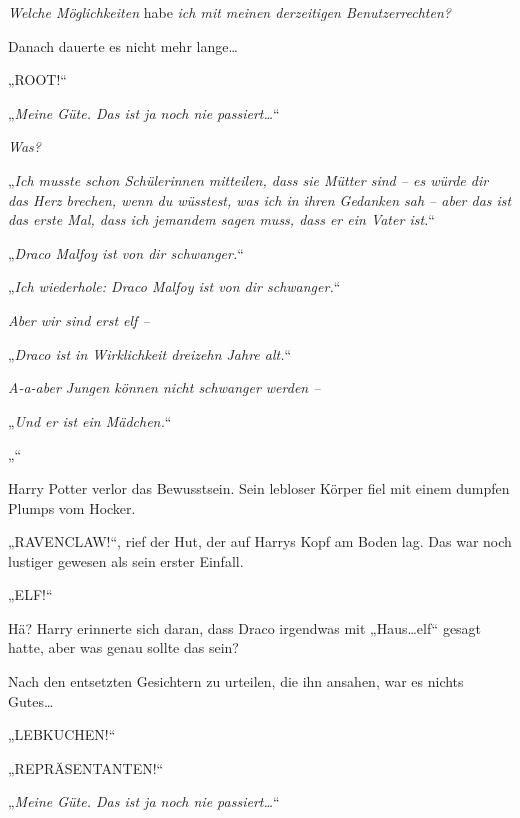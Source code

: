 \emph{Welche Möglichkeiten} habe \emph{ich mit meinen derzeitigen Benutzerrechten?}

Danach dauerte es nicht mehr lange…

„ROOT!“

\later

„\emph{Meine Güte. Das ist ja noch nie passiert…}“

\emph{Was?}

„\emph{Ich musste schon Schülerinnen mitteilen, dass sie Mütter sind – es würde dir das Herz brechen, wenn du wüsstest, was ich in ihren Gedanken sah – aber das ist das erste Mal, dass ich jemandem sagen muss, dass er ein Vater ist.}“

\emph{}

„\emph{Draco Malfoy ist von dir schwanger.}“

\emph{}

„\emph{Ich wiederhole: Draco Malfoy ist von dir schwanger.}“

\emph{Aber wir sind erst elf –}

„\emph{Draco ist in Wirklichkeit dreizehn Jahre alt.}“

\emph{A-a-aber Jungen können nicht schwanger werden –}

„\emph{Und er ist ein Mädchen.}“

\emph{}

„\emph{}“

Harry Potter verlor das Bewusstsein. Sein lebloser Körper fiel mit einem dumpfen Plumps vom Hocker.

„RAVENCLAW!“, rief der Hut, der auf Harrys Kopf am Boden lag. Das war noch lustiger gewesen als sein erster Einfall.

\later

„ELF!“

Hä? Harry erinnerte sich daran, dass Draco irgendwas mit „Haus…elf“ gesagt hatte, aber was genau sollte das sein?

Nach den entsetzten Gesichtern zu urteilen, die ihn ansahen, war es nichts Gutes…

\later

„LEBKUCHEN!“

\later

„REPRÄSENTANTEN!“

\later

„\emph{Meine Güte. Das ist ja noch nie passiert…}“

